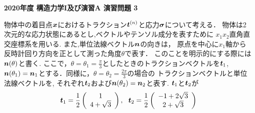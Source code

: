 \documentclass[10pt,a4j]{jarticle}
\newlength{\minitwocolumn}
\begin{document}
\newcommand{\fat}[1]{\mbox{\boldmath $#1$}}
\newcommand{\D}{\partial}
\newcommand{\w}{\omega}
\newcommand{\ga}{\alpha}
\newcommand{\gb}{\beta}
\newcommand{\gx}{\xi}
\newcommand{\gz}{\zeta}
\newcommand{\vhat}[1]{\hat{\fat{#1}}}
\newcommand{\spc}{\vspace{0.7\baselineskip}}
\newcommand{\halfspc}{\vspace{0.3\baselineskip}}

\pagestyle{empty}
\newcommand{\twofig}[2]
 {
   \begin{figure}[h]
     \begin{minipage}[t]{\minitwocolumn}
         \begin{center}   #1
         \end{center}
     \end{minipage}
         \hspace{\columnsep}
     \begin{minipage}[t]{\minitwocolumn}
         \begin{center} #2
         \end{center}
     \end{minipage}
   \end{figure}
 }
\begin{center}
	{\Large \bf 2020年度 構造力学I及び演習A 演習問題 3}
\end{center}
\vspace{5mm}
物体中の着目点$\fat{x}$におけるトラクション$\fat{t}^{(n)}$と応力$\fat{\sigma}$について考える．
物体は2次元的な応力状態にあるとし,ベクトルやテンソル成分を表すために
$x_1x_2$直角直交座標系を用いる. また,単位法線ベクトル$\fat{n}$の向きは，
原点を中心に$x_1$軸から反時計回り方向を正として測った角度$\theta$で表す．
このことを明示的にする際には$\fat{n}(\theta)$と書く.
ここで，$\theta=\theta_1=\frac{\pi}{3}$としたときのトラクションベクトルを$\fat{t}_1$, 
$\fat{n}(\theta_1)=\fat{n}_1$とする．同様に，$\theta=\theta_2=\frac{2\pi}{3}$の場合の
トラクションベクトルと単位法線ベクトルを, それぞれ$\fat{t}_2$および$\fat{n}(\theta_2)=\fat{n}_2$と表す. 
$\fat{t}_1$と$\fat{t}_2$が
\[
	\fat{t}_1=
	\frac{1}{2}
	\left(
		\begin{array}{c}
			1 \\
			4+\sqrt{3} 
		\end{array}
	\right), \ \ 
	\fat{t}_2=
	\frac{1}{2}
	\left(
		\begin{array}{c}
			-1+2\sqrt{3} \\
			2+\sqrt{3}
		\end{array}
	\right)
\]
\end{document}
